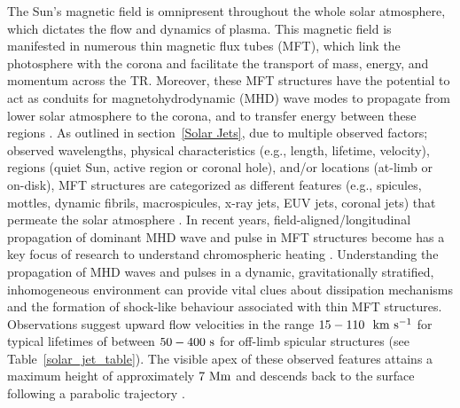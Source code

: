 %
The Sun's magnetic field is omnipresent throughout the whole solar atmosphere, which dictates the flow and dynamics of plasma. This magnetic field is manifested in numerous thin magnetic flux tubes (MFT), which link the photosphere with the corona and facilitate the transport of mass, energy, and momentum across the TR. Moreover, these MFT structures have the potential to act as conduits for magnetohydrodynamic (MHD) wave modes to propagate from lower solar atmosphere to the corona, and to transfer energy between these regions \citep{Pontieu2004Natur, Kukhianidze2006AA, Zaqarashvili2007A&A, He2009AA497525H}. As outlined in section~\ref{Solar Jets}, due to multiple observed factors; observed wavelengths, physical characteristics (e.g., length, lifetime, velocity), regions (quiet Sun, active region or coronal hole), and/or locations (at-limb or on-disk), MFT structures are categorized as different features (e.g., spicules, mottles, dynamic fibrils, macrospicules, x-ray jets, EUV jets, coronal jets) that permeate the solar atmosphere \citep[see reviews by:][]{Beckers1968, Beckers1972ARA&A, Tsiropoula2012}.  In recent years, field-aligned/longitudinal propagation of dominant MHD wave and pulse in MFT structures become has a key focus of research to understand chromospheric heating \citep{Narain1990, Zaqarashvili_2009SSRv, Jess2015}. Understanding the propagation of MHD waves and pulses in a dynamic, gravitationally stratified, inhomogeneous environment can provide vital clues about dissipation mechanisms and the formation of shock-like behaviour associated with thin MFT structures. Observations suggest upward flow velocities in the range $15-110 ~~\rm{km ~s^{-1}}$ for typical lifetimes of between $50-400~\rm{s}$ for off-limb spicular structures (see Table~\ref{solar_jet_table}). The visible apex of these observed features attains a maximum height of approximately $7~\rm{Mm}$ and descends back to the surface following a parabolic trajectory \citep{Pereira2012,Pereira2016ApJ82465P}. \np
%

